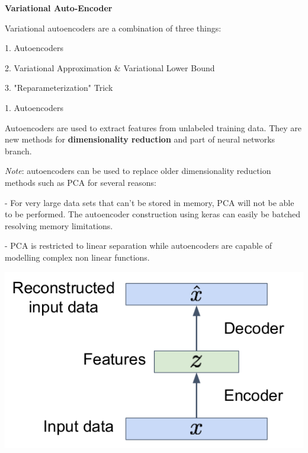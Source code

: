 {\fontsize{12pt}{22pt} \textbf{Variational Auto-Encoder}\par}

\vspace{5mm}

Variational autoencoders are a combination of three things:

1. Autoencoders

2. Variational Approximation \& Variational Lower Bound

3. "Reparameterization" Trick

\vspace{5mm}

1. Autoencoders

Autoencoders are used to extract features from unlabeled training data. They are new methods for \textbf{dimensionality reduction} and part of neural networks branch.

\vspace{5mm}

\textit{Note}: autoencoders can be used to replace older dimensionality reduction methods such as PCA for several reasons:

- For very large data sets that can’t be stored in memory, PCA will not be able to be performed. The autoencoder construction using keras can easily be batched resolving memory limitations.

- PCA is restricted to linear separation while autoencoders are capable of modelling complex non linear functions.

\begin{center}
\includegraphics[scale=0.3]{Autoencoders.png}
\end{center}

\vspace{5mm}

